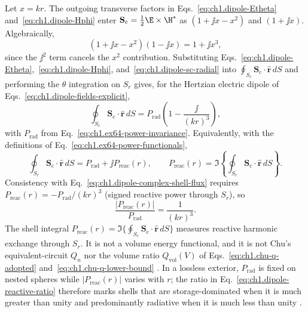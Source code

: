 Let $x=kr$. The outgoing transverse factors in Eqs.~\eqref{eq:ch1.dipole-Etheta} and~\eqref{eq:ch1.dipole-Hphi} enter $\mathbf{S}_\mathrm{c}=\tfrac12\E\times\H^*$ as $(1+\jj x-x^2)$ and $(1+\jj x)$. Algebraically,
\begin{equation}
\label{eq:ch1.dipole-shell-algebra}
(1+\jj x-x^2)(1-\jj x)=1+\jj x^3,
\end{equation}
since the $\jj^2$ term cancels the $x^2$ contribution. Substituting Eqs.~\eqref{eq:ch1.dipole-Etheta},~\eqref{eq:ch1.dipole-Hphi}, and~\eqref{eq:ch1.dipole-sc-radial} into $\oint_{S_r}\mathbf{S}_\mathrm{c}\cdot\hat{\mathbf{r}}\,dS$ and performing the $\theta$ integration on $S_r$ gives, for the Hertzian electric dipole of Eqs.~\eqref{eq:ch1.dipole-fields-explicit},
\begin{equation}
\label{eq:ch1.dipole-complex-shell-flux}
\oint_{S_r}\mathbf{S}_\mathrm{c}\cdot\hat{\mathbf{r}}\,dS
=P_{\mathrm{rad}}\left(1-\frac{\jj}{(kr)^3}\right),
\end{equation}
with $P_{\mathrm{rad}}$ from Eq.~\eqref{eq:ch1.ex64-power-invariance}. Equivalently, with the definitions of Eq.~\eqref{eq:ch1.ex64-power-functionals},
\begin{equation}
\label{eq:ch1.ex64-complex-power}
\oint_{S_r}\mathbf{S}_\mathrm{c}\cdot\hat{\mathbf{r}}\,dS
=P_{\mathrm{rad}}+\jj P_{\mathrm{reac}}(r),
\qquad
P_{\mathrm{reac}}(r)=\Im\!\left\{\oint_{S_r}\mathbf{S}_\mathrm{c}\cdot\hat{\mathbf{r}}\,dS\right\}.
\end{equation}
Consistency with Eq.~\eqref{eq:ch1.dipole-complex-shell-flux} requires $P_{\mathrm{reac}}(r)=-P_{\mathrm{rad}}/(kr)^3$ (signed reactive power through $S_r$), so
\begin{equation}
\label{eq:ch1.dipole-reactive-ratio}
\frac{\bigl|P_{\mathrm{reac}}(r)\bigr|}{P_{\mathrm{rad}}}=\frac{1}{(kr)^3}.
\end{equation}
The shell integral $P_{\mathrm{reac}}(r)=\Im\{\oint_{S_r}\mathbf{S}_\mathrm{c}\cdot\hat{\mathbf{r}}\,dS\}$ measures reactive harmonic exchange through $S_r$. It is not a volume energy functional, and it is not Chu's equivalent-circuit $Q_n$ nor the volume ratio $Q_{\mathrm{vol}}(V)$ of Eqs.~\eqref{eq:ch1.chu-q-adopted} and~\eqref{eq:ch1.chu-q-lower-bound} \cite{poynting1884,stratton1941,chu1948,mcclean1996}. In a lossless exterior, $P_{\mathrm{rad}}$ is fixed on nested spheres while $\bigl|P_{\mathrm{reac}}(r)\bigr|$ varies with $r$; the ratio in Eq.~\eqref{eq:ch1.dipole-reactive-ratio} therefore marks shells that are storage-dominated when it is much greater than unity and predominantly radiative when it is much less than unity \cite{stratton1941}.


